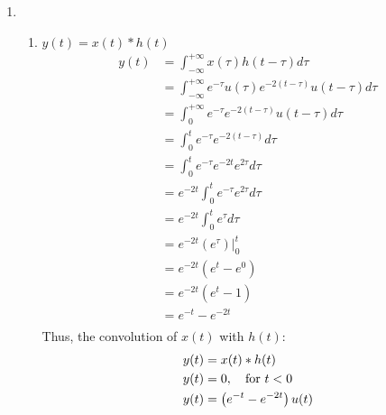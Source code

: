 \documentclass[10pt,a4paper, margin=1in]{article}
\begin{document}
\begin{enumerate}
\item %
    \begin{enumerate}
    \item %
    $y(t)=x(t)*h(t)$ \\
    \begin{equation}
        \begin{split}
             y(t)&=\int^{+\infty}_{-\infty}x(\tau)h(t-\tau)d\tau\\
             &=\int^{+\infty}_{-\infty}e^{-\tau}u(\tau)e^{-2(t-\tau)}u(t-\tau)d\tau\\
             &=\int^{+\infty}_{0}e^{-\tau}e^{-2(t-\tau)}u(t-\tau)d\tau\\
             &=\int^{t}_{0}e^{-\tau}e^{-2(t-\tau)}d\tau\\
             &=\int^{t}_{0}e^{-\tau}e^{-2t}e^{2\tau}d\tau\\
             &=e^{-2t}\int^{t}_{0}e^{-\tau}e^{2\tau}d\tau\\
             &=e^{-2t}\int^{t}_{0}e^{\tau}d\tau\\
             &=e^{-2t}\left(e^\tau \right)|^{t}_{0}\\
             &=e^{-2t}\left(e^t - e^0 \right)\\
             &=e^{-2t}\left(e^t - 1 \right)\\
             &=e^{-t}-e^{-2t}\\
        \end{split}
    \end{equation}
    Thus, the convolution of $x(t)$ with $h(t)$:
    \begin{equation}
        \begin{split}
            y(t) &= x(t) * h(t)\\
            y(t) &= 0, \text{\quad for } t < 0\\
            y(t) &= \left( e^{-t}-e^{-2t} \right)u(t)
        \end{split}
    \end{equation}


\end{enumerate}
\end{enumerate}
\end{document}

